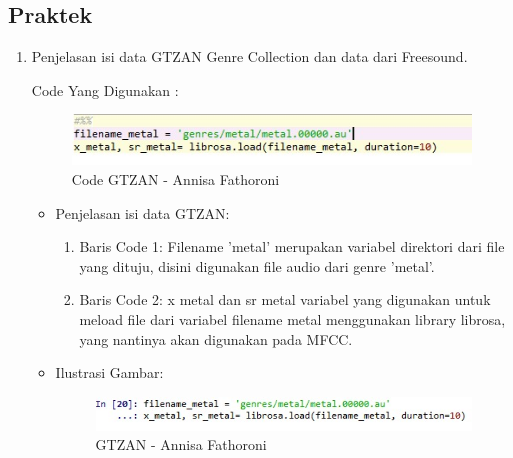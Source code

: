 \subsection{Praktek}
\begin{enumerate}
\item Penjelasan isi data GTZAN Genre Collection dan data dari Freesound.

\par Code Yang Digunakan :
\begin{figure}[!hbtp]
\centering
\includegraphics[scale=0.7]{figures/Chapter6AnnisaFathoroni16.jpeg}
\caption{Code GTZAN - Annisa Fathoroni}
\label{Code Display MFCC - Annisa Fathoroni}
\end{figure}

\begin{itemize}
\item Penjelasan isi data GTZAN:

\begin{enumerate}
\item Baris Code 1: Filename 'metal' merupakan variabel direktori dari file yang dituju, disini digunakan file audio dari genre 'metal'.
\item Baris Code 2: x metal dan sr metal variabel yang digunakan untuk meload file dari variabel filename metal menggunakan library librosa, yang nantinya akan digunakan pada MFCC.

\end{enumerate}

\item Ilustrasi Gambar:

\begin{figure}[!hbtp]
\centering
\includegraphics[scale=0.7]{figures/Chapter6AnnisaFathoroni17.jpeg}
\caption{GTZAN - Annisa Fathoroni}
\label{GTZAN - Annisa Fathoroni}
\end{figure}

\end{itemize}


\end{enumerate}
